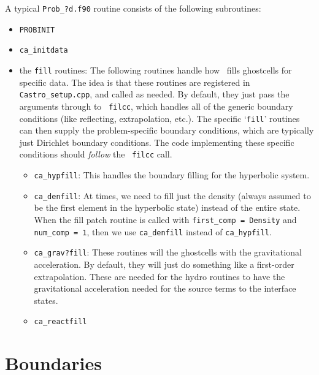 A typical {\tt Prob\_?d.f90} routine consists of the following 
subroutines:
\begin{itemize}
\item {\tt PROBINIT}

\item {\tt ca\_initdata}

\item the {\tt *fill} routines: The following routines handle how
  \castro\ fills ghostcells for specific data.  The idea is that these
  routines are registered in {\tt Castro\_setup.cpp}, and called as
  needed.  By default, they just pass the arguments through to {\tt
    filcc}, which handles all of the generic boundary conditions (like
  reflecting, extrapolation, etc.).  The specific `{\tt fill}'
  routines can then supply the problem-specific boundary conditions,
  which are typically just Dirichlet boundary conditions.  The code
  implementing these specific conditions should {\em follow} the {\tt
    filcc} call.

\begin{itemize}
\item {\tt ca\_hypfill}:
  This handles the boundary filling for the hyperbolic system.

\item {\tt ca\_denfill}: At times, we need to fill just the density
  (always assumed to be the first element in the hyperbolic state)
  instead of the entire state.  When the fill patch routine is called
  with {\tt first\_comp = Density} and {\tt num\_comp = 1}, then we
  use {\tt ca\_denfill} instead of {\tt ca\_hypfill}.

\item {\tt ca\_grav?fill}: These routines will the ghostcells with the
  gravitational acceleration.  By default, they will just do something
  like a first-order extrapolation.  These are needed for the hydro
  routines to have the gravitational acceleration needed for the 
  source terms to the interface states.

\item {\tt ca\_reactfill}
\end{itemize}

\end{itemize}


\section{Boundaries}
